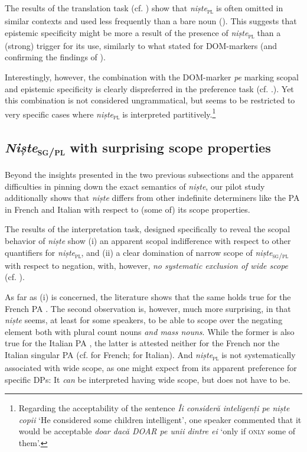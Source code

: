 \documentclass[output=paper,colorlinks,citecolor=brown]{langscibook}
\begin{document}
The results of the translation task (cf. ) show that \textit{niște}\textsubscript{\textsc{pl}} is often omitted in similar contexts and used less frequently than a bare noun (). This suggests that epistemic specificity might be more a result of the presence of \textit{niște}\textsubscript{\textsc{pl}} than a (strong) trigger for its use, similarly to what \citet{KleinSwart2011} stated for DOM-markers (and confirming the findings of \cite{Dobrovie-SorinGiurgea2013}).

Interestingly, however, the combination with the DOM-marker \textit{pe} marking scopal and epistemic specificity is clearly dispreferred in the preference task (cf. .). Yet this combination is not considered ungrammatical, but seems to be restricted to very specific cases where \textit{niște}\textsubscript{\textsc{pl}} is interpreted partitively.\footnote{Regarding the acceptability of the sentence \textit{Îi consider\u{a} inteligenți pe niște copii} ‘He considered some children intelligent’, one speaker commented that it would be acceptable \textit{doar dac\u{a} DOAR pe unii dintre ei} ‘only if \textsc{only} some of them’.}

\subsection{\textit{Niște}\textsubscript{\textsc{sg/pl}} with surprising scope properties}\label{sec:ds5.3}
Beyond the insights presented in the two previous subsections and the apparent difficulties in pinning down the exact semantics of \textit{niște}, our pilot study additionally shows that \textit{niște}\textsubscript{} differs from other indefinite determiners like the PA in French and Italian with respect to (some of) its scope properties.

The results of the interpretation task, designed specifically to reveal the scopal behavior of \textit{niște}\textsubscript{} show (i) an apparent scopal indifference with respect to other quantifiers for \textit{niște}\textsc{\textsubscript{\textsc{pl}}}, and (ii) a clear domination of narrow scope of \textit{niște}\textsc{\textsubscript{sg/pl}} with respect to negation, with, however, \textit{no systematic exclusion of wide scope} (cf. ). 

As far as (i) is concerned, the literature shows that the same holds true for the French PA  \citep[cf.][139]{Ihsane2008}. The second observation is, however, much more surprising, in that \textit{niște} seems, at least for some speakers, to be able to scope over the negating element both with plural count nouns \textit{and mass nouns}. While the former is also true for the Italian PA \citep[cf.][60]{CardinalettiGiusti2016}, the latter is attested neither for the French nor the Italian singular PA (cf. \cite[139f.]{Ihsane2008} for French; \cite[60]{CardinalettiGiusti2016} for Italian). And \textit{niște}\textsc{\textsubscript{\textsc{pl}}} is not systematically associated with wide scope, as one might expect from its apparent preference for specific DPs: It \textit{can} be interpreted having wide scope, but does not have to be.
\end{document}
